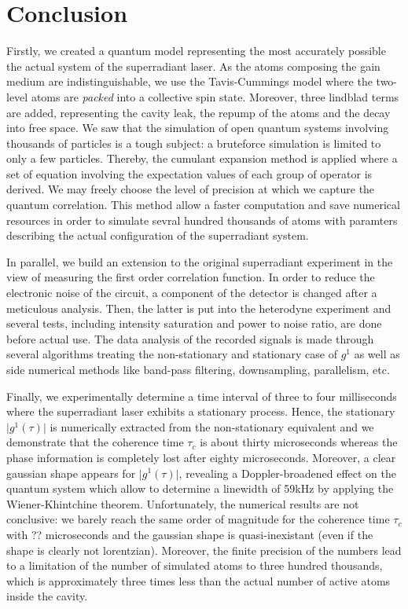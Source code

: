 \documentclass[10pt]{report}
\begin{document}
\chapter{Conclusion}

Firstly, we created a quantum model representing the most accurately possible the actual system of the superradiant laser. As the atoms composing the gain medium are indistinguishable, we use the Tavis-Cummings model where the two-level atoms are \textit{packed} into a collective spin state. Moreover, three lindblad terms are added, representing the cavity leak, the repump of the atoms and the decay into free space. We saw that the simulation of open quantum systems involving thousands of particles is a tough subject: a bruteforce simulation is limited to only a few particles. Thereby, the cumulant expansion method is applied where a set of equation involving the expectation values of each group of operator is derived. We may freely choose the level of precision at which we capture the quantum correlation. This method allow a faster computation and save numerical resources in order to simulate sevral hundred thousands of atoms with paramters describing the actual configuration of the superradiant system.

In parallel, we build an extension to the original superradiant experiment in the view of measuring the first order correlation function. In order to reduce the electronic noise of the circuit, a component of the detector is changed after a meticulous analysis. Then, the latter is put into the heterodyne experiment and several tests, including intensity saturation and power to noise ratio, are done before actual use. The data analysis of the recorded signals is made through several algorithms treating the non-stationary and stationary case of $g^1$ as well as side numerical methods like band-pass filtering, downsampling, parallelism, etc.

Finally, we experimentally determine a time interval of three to four milliseconds where the superradiant laser exhibits a stationary process. Hence, the stationary $\vert g^1(\tau) \vert$ is numerically extracted from the non-stationary equivalent and we demonstrate that the coherence time $\tau_c$ is about thirty microseconds whereas the phase information is completely lost after eighty microseconds. Moreover, a clear gaussian shape appears for $\vert g^1(\tau) \vert$, revealing a Doppler-broadened effect on the quantum system which allow to determine a linewidth of 59kHz by applying the Wiener-Khintchine theorem. Unfortunately, the numerical results are not conclusive: we barely reach the same order of magnitude for the coherence time $\tau_c$ with ?? microseconds and the gaussian shape is quasi-inexistant (even if the shape is clearly not lorentzian). Moreover, the finite precision of the numbers lead to a limitation of the number of simulated atoms to three hundred thousands, which is approximately three times less than the actual number of active atoms inside the cavity.
\end{document}
